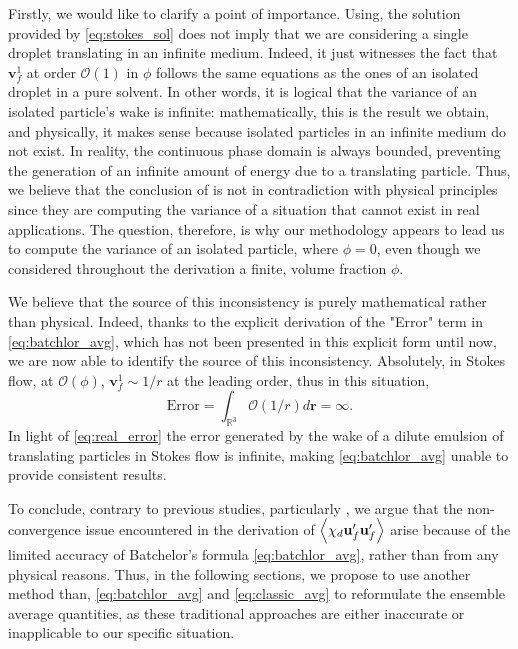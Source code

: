 Firstly, we would like to clarify a point of importance. 
Using, the solution provided by \ref{eq:stokes_sol} does not imply that we are considering a single droplet translating in an infinite medium.
Indeed, it just witnesses the fact that  $\textbf{v}_f^{1}$ at order $\mathcal{O}(1)$ in $\phi$ follows the same equations as the ones of an isolated droplet in a pure solvent. 
In other words, it is logical that the variance of an isolated particle's wake is infinite: mathematically, this is the result we obtain, and physically, it makes sense because isolated particles in an infinite medium do not exist. 
In reality, the continuous phase domain is always bounded, preventing the generation of an infinite amount of energy due to a translating particle.
Thus, we believe that the conclusion of \citet{caflisch1985variance} is not in contradiction with physical principles since they are computing the variance of a situation that cannot exist in real applications. 
The question, therefore, is why our methodology appears to lead us to compute the variance of an isolated particle, where $\phi = 0$, even though we considered throughout the derivation a finite, volume fraction $\phi$.

We believe that the source of this inconsistency is purely mathematical rather than physical. 
Indeed, thanks to the explicit derivation of the "Error" term in \ref{eq:batchlor_avg}, which has not been presented in this explicit form until now, we are now able to identify the source of this inconsistency.
Absolutely, in Stokes flow, at $\mathcal{O}(\phi)$, $\textbf{v}_f^{1} \sim 1/r$ at the leading order, thus in this situation, 
\begin{equation}
    \text{Error}
    = 
    \int_{\mathbb{R}^3} 
    \mathcal{O}(1/r) d\textbf{r}
    = \infty. 
    \label{eq:real_error}
\end{equation}
In light of \ref{eq:real_error} the error generated by the wake of a dilute emulsion of translating particles in Stokes flow is infinite, making \ref{eq:batchlor_avg} unable to provide consistent results. 


To conclude, contrary to previous studies, particularly \citet{caflisch1985variance}, we argue that the non-convergence issue encountered in the derivation of $\left<\chi_d \textbf{u}_f'\textbf{u}_f'\right>$ arise because of the limited accuracy of Batchelor's formula \eqref{eq:batchlor_avg}, rather than from any physical reasons.
Thus, in the following sections, we propose to use another method than, \ref{eq:batchlor_avg} and \ref{eq:classic_avg} to reformulate the ensemble average quantities, as these traditional approaches are either inaccurate or inapplicable to our specific situation. 






